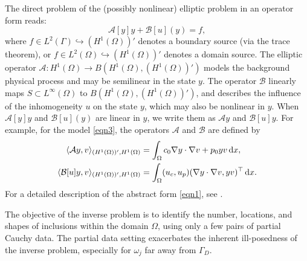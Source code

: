 \documentclass[onefignum,onetabnum]{siamart190516}
\numberwithin{equation}{section}
\begin{document}
The direct problem of the (possibly nonlinear) elliptic problem in an operator form reads:
\begin{equation}\label{eqn1}
\mathcal{A}[y]y + \mathcal{B}[u](y) = f,
\end{equation}
where $f \in L^2(\Gamma) \hookrightarrow (H^1(\Omega))'$ denotes a boundary source (via the trace theorem), or $f \in L^2(\Omega) \hookrightarrow (H^1(\Omega))'$ denotes a domain source.
The elliptic operator $\mathcal{A}: H^1(\Omega) \to B(H^1(\Omega), (H^1(\Omega))')$ models the background physical process and may be semilinear in the state $y$.
The operator $\mathcal{B}$ linearly maps $S \subset L^\infty(\Omega)$ to $B(H^1(\Omega), (H^1(\Omega))')$, and describes the influence of the inhomogeneity $u$ on the state $y$, which may also be nonlinear in $y$.
When $\mathcal{A}[y]y$ and $\mathcal{B}[u](y)$ are linear in $y$, we write them as $\mathcal{A}y$ and $\mathcal{B}[u]y$.
For example, for the model \eqref{eqn3}, the operators $\mathcal{A}$ and $\mathcal{B}$ are defined by
\begin{equation*}
\begin{aligned}
\langle\mathcal{A}y,v\rangle_{(H^{1}(\Omega))', H^{1}(\Omega)} &= \int_{\Omega} c_0 \nabla y \cdot \nabla v + p_0 y v \, {\rm d}x, \\
\langle\mathcal{B}[u]y,v\rangle_{(H^{1}(\Omega))', H^{1}(\Omega)} &= \int_{\Omega} (u_{c},u_{p}) (\nabla y \cdot \nabla v , y v)^{\top} \, {\rm d}x.
\end{aligned}
\end{equation*}
For a detailed description of the abstract form \eqref{eqn1}, see \cite[Section 2]{Ito2025Iterative}.

The objective of the inverse problem is to identify the number, locations, and shapes of inclusions within the domain $\Omega$, using only a few pairs of partial Cauchy data.
The partial data setting exacerbates the inherent ill-posedness of the inverse problem, especially for $\omega_{j}$ far away from $\Gamma_{D}$.
\end{document}
